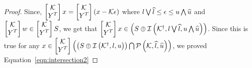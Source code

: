 \begin{proof}
Since, $\mymatrix{\qtemp\\ Y^T}x=\mymatrix{\qtemp\\
Y^T}\lt(x-\qtemp\epsilon\rt)$ where
$\join{\lb}{\plb}\leq\epsilon\leq\meet{\ub}{\pub}$ and
$\mymatrix{\qtemp\\ Y^T}w\in\mymatrix{\qtemp\\ Y^T}S$, we get that
$\mymatrix{\qtemp\\ Y^T}x\in\lt(S
 \oplus\iztope{\pinv{\qtemp}}{\join{\lb}{\plb}}{\meet{\ub}{\pub}}\rt)$.
 Since this is true for any $x\in\mymatrix{\qtemp\\
 Y^T}\lt(\lt(S\oplus \iztope{\pinv{\qtemp}}{\lb}{\ub}\rt)\bigcap\ptope{\qtemp}{\plb}{\pub}\rt)$,
 we proved Equation~\ref{eqn:intersection2}
\end{proof}
